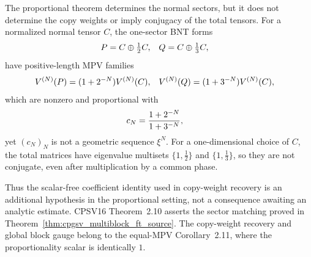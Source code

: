 \begin{remark}%
    \label{rem:proportional_length_scalar_gap}
    The proportional theorem determines the normal sectors, but it does not
    determine the copy weights or imply conjugacy of the total tensors. For a
    normalized normal tensor $C$, the one-sector BNT forms
    \begin{align}
        P
         & =C\oplus \tfrac12 C,
         &
        Q
         & =C\oplus \tfrac13 C,
        \notag
    \end{align}
    have positive-length MPV families
    \begin{align}
        V^{(N)}(P)
         & =(1+2^{-N})V^{(N)}(C),
         &
        V^{(N)}(Q)
         & =(1+3^{-N})V^{(N)}(C),
        \notag
    \end{align}
    which are nonzero and proportional with
    \begin{align}
        c_N
         & =\frac{1+2^{-N}}{1+3^{-N}},
        \notag
    \end{align}
    yet $(c_N)_N$ is not a geometric sequence $\xi^N$. For a one-dimensional
    choice of $C$, the total matrices have eigenvalue multisets
    $\{1,\tfrac12\}$ and $\{1,\tfrac13\}$, so they are not conjugate, even
    after multiplication by a common phase.

    Thus the scalar-free coefficient identity used in copy-weight recovery is
    an additional hypothesis in the proportional setting, not a consequence
    awaiting an analytic estimate. CPSV16 Theorem~2.10 asserts the sector
    matching proved in Theorem~\ref{thm:cpgsv_multiblock_ft_source}. The
    copy-weight recovery and global block gauge belong to the equal-MPV
    Corollary~2.11, where the proportionality scalar is identically $1$.
\end{remark}
